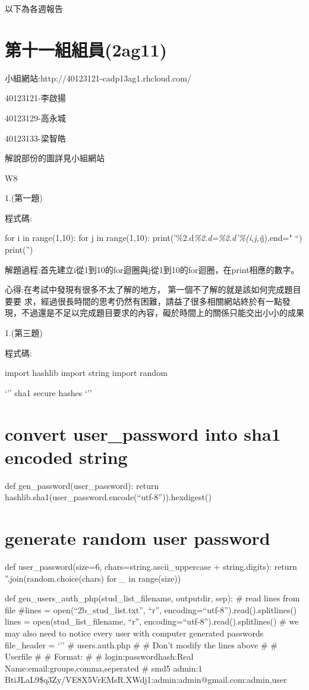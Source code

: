 \documentclass[]{article}
\begin{document}
以下為各週報告

\section{第十一組組員(2ag11)}\label{ux7b2cux5341ux4e00ux7d44ux7d44ux54e12ag11}

小組網站:http://40123121-cadp13ag1.rhcloud.com/

40123121-李啟揚

40123129-高永城

40123133-梁智皓

解說部份的圖詳見小組網站

W8

1.(第一題)

程式碼:

for i in range(1,10): for j in range(1,10):
print('\%2.d\emph{\%2.d=\%2.d'\%(i,j,i}j),end=" ``) print('')

解題過程:首先建立i從1到10的for迴圈與j從1到10的for迴圈，在print相應的數字。

心得:在考試中發現有很多不太了解的地方，
第一個不了解的就是該如何完成題目要要
求，經過很長時間的思考仍然有困難，請益了很多相關網站終於有一點發現，不過還是不足以完成題目要求的內容，礙於時間上的關係只能交出小小的成果

1.(第三題)

程式碼:

import hashlib import string import random

`'' sha1 secure hashes `''

\section{convert user\_password into sha1 encoded
string}\label{convert-userux5fpassword-into-sha1-encoded-string}

def gen\_password(user\_password): return
hashlib.sha1(user\_password.encode(``utf-8'')).hexdigest()

\section{generate random user
password}\label{generate-random-user-password}

def user\_password(size=6, chars=string.ascii\_uppercase +
string.digits): return ''.join(random.choice(chars) for \_ in
range(size))

def gen\_users\_auth\_php(stud\_list\_filename, outputdir, sep): \# read
lines from file \#lines = open(``2b\_stud\_list.txt'', ``r'',
encoding=``utf-8'').read().splitlines() lines =
open(stud\_list\_filename, ``r'',
encoding=``utf-8'').read().splitlines() \# we may also need to notice
every user with computer generated passwords file\_header = `'' \#
users.auth.php \# \# Don't modify the lines above \# \# Userfile \# \#
Format: \# \# login:passwordhash:Real Name:email:groups,comma,seperated
\# smd5
admin:$1$BtiJLaL9\$q3Zy/VE8X5VrEMsR.XWdj1:admin:admin@gmail.com:admin,user
\end{document}
